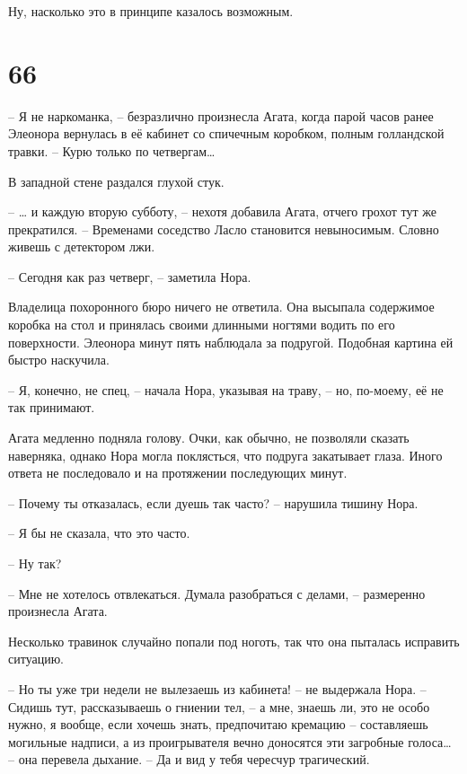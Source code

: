\documentclass[
  a5paperpaper,
  DIV=11,
  numbers=noendperiod]{scrreprt}
\begin{document}
Ну, насколько это в принципе казалось возможным.

\section*{66}\label{66}


-- Я не наркоманка, -- безразлично произнесла Агата, когда парой часов
ранее Элеонора вернулась в её кабинет со спичечным коробком, полным
голландской травки. -- Курю только по четвергам\ldots{}

В западной стене раздался глухой стук.

-- \ldots{} и каждую вторую субботу, -- нехотя добавила Агата, отчего
грохот тут же прекратился. -- Временами соседство Ласло становится
невыносимым. Словно живешь с детектором лжи.

-- Сегодня как раз четверг, -- заметила Нора.

Владелица похоронного бюро ничего не ответила. Она высыпала содержимое
коробка на стол и принялась своими длинными ногтями водить по его
поверхности. Элеонора минут пять наблюдала за подругой. Подобная картина
ей быстро наскучила.

-- Я, конечно, не спец, -- начала Нора, указывая на траву, -- но,
по-моему, её не так принимают.

Агата медленно подняла голову. Очки, как обычно, не позволяли сказать
наверняка, однако Нора могла поклясться, что подруга закатывает глаза.
Иного ответа не последовало и на протяжении последующих минут.

-- Почему ты отказалась, если дуешь так часто? -- нарушила тишину Нора.

-- Я бы не сказала, что это часто.

-- Ну так?

-- Мне не хотелось отвлекаться. Думала разобраться с делами, --
размеренно произнесла Агата.

Несколько травинок случайно попали под ноготь, так что она пыталась
исправить ситуацию.

-- Но ты уже три недели не вылезаешь из кабинета! -- не выдержала Нора.
-- Сидишь тут, рассказываешь о гниении тел, -- а мне, знаешь ли, это не
особо нужно, я вообще, если хочешь знать, предпочитаю кремацию --
составляешь могильные надписи, а из проигрывателя вечно доносятся эти
загробные голоса\ldots{} -- она перевела дыхание. -- Да и вид у тебя
чересчур трагический.
\end{document}
